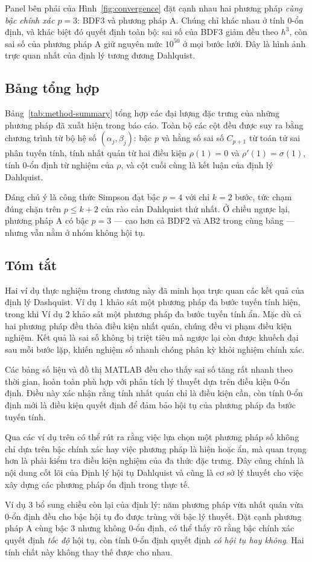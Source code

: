 Panel bên phải của Hình~\ref{fig:convergence} đặt cạnh nhau hai phương pháp \emph{cùng
bậc chính xác $p=3$}: BDF3 và phương pháp A. Chúng chỉ khác nhau ở tính $0$-ổn định, và
khác biệt đó quyết định toàn bộ: sai số của BDF3 giảm đều theo $h^{3}$, còn sai số của
phương pháp A giữ nguyên mức $10^{50}$ ở mọi bước lưới. Đây là hình ảnh trực quan nhất
của định lý tương đương Dahlquist.

\subsection{Bảng tổng hợp}

Bảng~\ref{tab:method-summary} tổng hợp các đại lượng đặc trưng của những phương pháp đã
xuất hiện trong báo cáo. Toàn bộ các cột đều được suy ra bằng chương trình từ bộ hệ số
$(\alpha_j,\beta_j)$: bậc $p$ và hằng số sai số $C_{p+1}$ từ toán tử sai phân tuyến
tính, tính nhất quán từ hai điều kiện $\rho(1)=0$ và $\rho'(1)=\sigma(1)$, tính
$0$-ổn định từ nghiệm của $\rho$, và cột cuối cùng là kết luận của định lý Dahlquist.



Đáng chú ý là công thức Simpson đạt bậc $p=4$ với chỉ $k=2$ bước, tức chạm đúng chặn
trên $p \le k+2$ của rào cản Dahlquist thứ nhất. Ở chiều ngược lại, phương pháp A có bậc
$p=3$ --- cao hơn cả BDF2 và AB2 trong cùng bảng --- nhưng vẫn nằm ở nhóm không hội tụ.

\subsection*{Tóm tắt}
Hai ví dụ thực nghiệm trong chương này đã minh họa trực quan các kết quả của định lý Dashquist. Ví dụ 1 khảo sát một phương pháp đa bước tuyến tính hiện, trong khi Ví dụ 2 khảo sát một phương pháp đa bước tuyến tính ẩn. Mặc dù cả hai phương pháp đều thỏa điều kiện nhất quán, chúng đều vi phạm điều kiện nghiệm. Kết quả là sai số không bị triệt tiêu mà ngược lại còn được khuếch đại sau mỗi bước lặp, khiến nghiệm số nhanh chóng phân kỳ khỏi nghiệm chính xác.

Các bảng số liệu và đồ thị MATLAB đều cho thấy sai số tăng rất nhanh theo thời gian, hoàn toàn phù hợp với phân tích lý thuyết dựa trên điều kiện 0-ổn định. Điều này xác nhận rằng tính nhất quán chỉ là điều kiện cần, còn tính 0-ổn định mới là điều kiện quyết định để đảm bảo hội tụ của phương pháp đa bước tuyến tính.

Qua các ví dụ trên có thể rút ra rằng việc lựa chọn một phương pháp số không chỉ dựa trên bậc chính xác hay việc phương pháp là hiện hoặc ẩn, mà quan trọng hơn là phải kiểm tra điều kiện nghiệm của đa thức đặc trưng. Đây cũng chính là nội dung cốt lõi của Định lý hội tụ Dahlquist và cũng là cơ sở lý thuyết cho việc xây dựng các phương pháp ổn định trong thực tế.

Ví dụ 3 bổ sung chiều còn lại của định lý: năm phương pháp vừa nhất quán vừa $0$-ổn định
đều cho bậc hội tụ đo được trùng với bậc lý thuyết. Đặt cạnh phương pháp A cùng bậc $3$
nhưng không $0$-ổn định, có thể thấy rõ rằng bậc chính xác quyết định \emph{tốc độ} hội
tụ, còn tính $0$-ổn định quyết định \emph{có hội tụ hay không}. Hai tính chất này không
thay thế được cho nhau.
